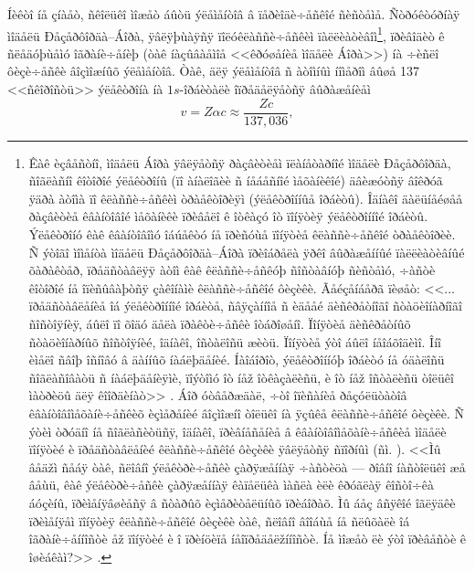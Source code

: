 Íèêòî íå çíàåò, ñêîëüêî ìîæåò áûòü ýëåìåíòîâ â ïåðèîäè÷åñêîé ñèñòåìå. Ñòðóêòóðíàÿ ìîäåëü Ðåçåðôîðäà--Áîðà, ÿâëÿþùàÿñÿ ïîëóêëàññè÷åñêèì ïàëëèàòèâîì\footnote{Êàê èçâåñòíî, ìîäåëü Áîðà ÿâëÿåòñÿ ðàçâèòèåì ïëàíåòàðíîé ìîäåëè Ðåçåðôîðäà, ñîãëàñíî êîòîðîé ýëåêòðîíû (ïî àíàëîãèè ñ íåáåñíîé ìåõàíèêîé) äâèæóòñÿ âîêðóã ÿäðà àòîìà ïî êëàññè÷åñêèì òðàåêòîðèÿì (ýëåêòðîííûå îðáèòû). Îäíàêî äàëüíåéøåå ðàçâèòèå êâàíòîâîé ìåõàíèêè ïðèâåëî ê îòêàçó îò ïîíÿòèÿ ýëåêòðîííîé îðáèòû. Ýëåêòðîíó êàê êâàíòîâîìó îáúåêòó íå ïðèñóùå ïîíÿòèå êëàññè÷åñêîé òðàåêòîðèè. Ñ ýòîãî ìîìåíòà ìîäåëü Ðåçåðôîðäà--Áîðà ïðèîáðåëà ÿðêî âûðàæåííûé ïàëëèàòèâíûé õàðàêòåð, ïðåäñòàâëÿÿ àòîì êàê êëàññè÷åñêóþ ñîñòàâíóþ ñèñòåìó, ÷àñòè êîòîðîé íå îïèñûâàþòñÿ çàêîíàìè êëàññè÷åñêîé ôèçèêè. Ãåéçåíáåðã ïèøåò: <<$\ldots$ ïðåäñòàâëåíèå îá ýëåêòðîííîé îðáèòå, ñâÿçàííîå ñ èäååé äèñêðåòíîãî ñòàöèîíàðíîãî ñîñòîÿíèÿ, áûëî ïî õîäó äåëà ïðàêòè÷åñêè îòáðîøåíî. Ïîíÿòèå äèñêðåòíûõ ñòàöèîíàðíûõ ñîñòîÿíèé, îäíàêî, îñòàëîñü æèòü. Ïîíÿòèå ýòî áûëî íåîáõîäèìî. Îíî èìåëî ñâîþ îñíîâó â äàííûõ íàáëþäåíèé. Íàîáîðîò, ýëåêòðîííóþ îðáèòó íå óäàëîñü ñîãëàñîâàòü ñ íàáëþäåíèÿìè, ïîýòîìó îò íåž îòêàçàëèñü, è îò íåž îñòàëèñü òîëüêî ìàòðèöû äëÿ êîîðäèíàò>> \cite[c.~97]{Heisen}. Áîð óòâåðæäàë, ÷òî îïèñàíèå ðåçóëüòàòîâ êâàíòîâîìåõàíè÷åñêèõ èçìåðåíèé âîçìîæíî òîëüêî íà ÿçûêå êëàññè÷åñêîé ôèçèêè. Ñ ýòèì òðóäíî íå ñîãëàñèòüñÿ, îäíàêî, ïðèâíåñåíèå â êâàíòîâîìåõàíè÷åñêèå ìîäåëè ïîíÿòèé è ïðåäñòàâëåíèé êëàññè÷åñêîé ôèçèêè ÿâëÿåòñÿ ñïîðíûì (ñì. \cite{Kar,deRonde}). <<Ìû âåäžì ñåáÿ òàê, ñëîâíî ýëåêòðè÷åñêè çàðÿæåííàÿ ÷àñòèöà --- ðîâíî íàñòîëüêî æå âåùü, êàê ýëåêòðè÷åñêè çàðÿæåííàÿ êàïåëüêà ìàñëà èëè êðóãëàÿ êîñòî÷êà áóçèíû, ïðèìåíÿâøèåñÿ â ñòàðûõ èçìåðèòåëüíûõ ïðèáîðàõ. Ìû áåç âñÿêîé îãëÿäêè ïðèìåíÿåì ïîíÿòèÿ êëàññè÷åñêîé ôèçèêè òàê, ñëîâíî âîîáùå íå ñëûõàëè îá îãðàíè÷åííîñòè åž ïîíÿòèé è î ïðèíöèïå íåîïðåäåëžííîñòè. Íå ìîæåò ëè ýòî ïðèâåñòè ê îøèáêàì?>> \cite[c.~250-251]{Heisen2}.}, ïðèâîäèò ê ñëåäóþùåìó îãðàíè÷åíèþ (òàê íàçûâàåìîå <<êðóøåíèå ìîäåëè Áîðà>>) íà ÷èñëî ôèçè÷åñêè âîçìîæíûõ ýëåìåíòîâ. Òàê, äëÿ ýëåìåíòîâ ñ àòîìíûì íîìåðîì âûøå 137 <<ñêîðîñòü>> ýëåêòðîíà íà $1s$-îðáèòàëè îïðåäåëÿåòñÿ âûðàæåíèåì
\[
v=Z\alpha c\approx\frac{Zc}{137{,}036},
\]
